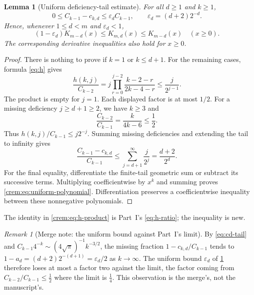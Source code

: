 \documentclass[11pt,a4paper]{article}
\newtheorem{lemma}[lemma]{Lemma}
\theoremstyle{definition}\newaliascnt{definition}{theorem}
\theoremstyle{remark}\newaliascnt{remark}{theorem}
\newtheorem{remark}[remark]{Remark}
\newcommand{\eps}{\varepsilon}
\begin{document}
\begin{lemma}[Uniform deficiency-tail estimate]\label{crem:lem:uniform-tail}
For all $d\ge1$ and $k\ge1$,
\begin{equation}
 0\le C_{k-1}-c_{k,d}
 \le\eps_d C_{k-1},
 \qquad \eps_d=(d+2)2^{-d}.
 \label{crem:eq:uniform-tail}
\end{equation}
Hence, whenever $1\le d<m$ and $\eps_d<1$,
\begin{equation}
 (1-\eps_d)K_{m-d}(x)\le K_{m,d}(x)\le K_{m-d}(x)
 \quad(x\ge0).
 \label{crem:eq:uniform-polynomial}
\end{equation}
The corresponding derivative inequalities also hold for $x\ge0$.
\end{lemma}
\begin{proof}
There is nothing to prove if $k=1$ or $k\le d+1$. For the remaining cases,
formula \eqref{eq:h} gives
\begin{equation}
 \frac{h(k,j)}{C_{k-2}}
 =j\prod_{r=0}^{j-2}\frac{k-2-r}{2k-4-r}
 \le\frac{j}{2^{j-1}}.
 \label{crem:eq:h-product}
\end{equation}
The product is empty for $j=1$. Each displayed factor is at most $1/2$.
For a missing deficiency $j\ge d+1\ge2$, we have $k\ge3$ and
\[
 \frac{C_{k-2}}{C_{k-1}}=\frac{k}{4k-6}\le\frac12.
\]
Thus $h(k,j)/C_{k-1}\le j2^{-j}$. Summing missing deficiencies and extending
the tail to infinity gives
\[
 \frac{C_{k-1}-c_{k,d}}{C_{k-1}}
 \le\sum_{j=d+1}^{\infty}\frac{j}{2^j}
 =\frac{d+2}{2^d}.
\]
For the final equality, differentiate the finite-tail geometric sum or
subtract its successive terms. Multiplying coefficientwise by $x^k$ and
summing proves \eqref{crem:eq:uniform-polynomial}. Differentiation preserves
a coefficientwise inequality between these nonnegative polynomials.
\end{proof}

The identity in \eqref{crem:eq:h-product} is Part~I's \eqref{eq:h-ratio};
the inequality is new.

\begin{remark}[Merge note: the uniform bound against Part~I's limit]
\label{crem:rem:ad}
By \eqref{eq:cd-tail} and $C_{k-1}4^{-k}\sim(4\sqrt\pi)^{-1}k^{-3/2}$, the
missing fraction $1-c_{k,d}/C_{k-1}$ tends to
$1-a_d=(d+2)2^{-(d+1)}=\eps_d/2$ as $k\to\infty$. The uniform bound
$\eps_d$ of \cref{crem:lem:uniform-tail} therefore loses at most a factor two
against the limit, the factor coming from $C_{k-2}/C_{k-1}\le\frac12$ where
the limit is $\frac14$. This observation is the merge's, not the
manuscript's.
\end{remark}
\end{document}
